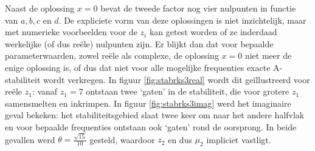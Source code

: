 \documentclass[12pt]{article}
\begin{document}
Naast de oplossing \(x=0\) bevat de tweede factor nog vier nulpunten in functie van \(a, b, c\) en \(d\). De expliciete vorm van deze oplossingen is niet inzichtelijk, maar met numerieke voorbeelden voor de \(z_i\) kan getest worden of ze inderdaad werkelijke (of dus reële) nulpunten zijn. Er blijkt dan dat voor bepaalde parameterwaarden, zowel reële als complexe, de oplossing \(x=0\) niet meer de enige oplossing is, of dus dat niet voor alle mogelijke frequenties exacte A-stabiliteit wordt verkregen. In figuur \ref{fig:stabrks3real} wordt dit geïllustreerd voor reële \(z_1\): vanaf \(z_1=7\) ontstaan twee `gaten' in de stabiliteit, die voor grotere \(z_1\) samensmelten en inkrimpen. In figuur \ref{fig:stabrks3imag} werd het imaginaire geval bekeken: het stabiliteitsgebied slaat twee keer om naar het andere halfvlak en voor bepaalde frequenties ontstaan ook `gaten' rond de oorsprong. In beide gevallen werd \(\theta=\frac{\sqrt{15}}{10}\) gesteld, waardoor \(z_2\) en dus \(\mu_2\) impliciet vastligt.
\end{document}

